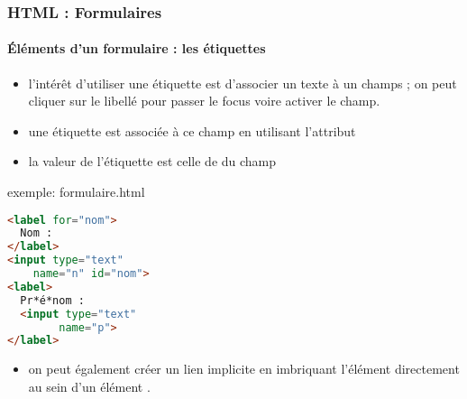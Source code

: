 \documentclass[xcolor=table]{beamer}
\begin{document}
\begin{frame}[fragile]
\frametitle{HTML : Formulaires}
\framesubtitle{Éléments d'un formulaire : les étiquettes}

\begin{minipage}{0.64\textwidth} 
	\begin{itemize}
		\item l'intérêt d'utiliser une étiquette est d'associer un texte à un champs ; on peut cliquer sur le libellé pour passer le focus voire activer le champ. 
		\item une étiquette est associée à ce champ en utilisant l'attribut 
		\item la valeur  de l'étiquette est celle de  du champ
	\end{itemize}
\end{minipage}
%
\begin{minipage}{0.35\textwidth}
\begin{exampleblock}{exemple: formulaire.html}
\lstset{escapeinside=**}
\scriptsize\bfseries\vspace{-6pt}
\begin{lstlisting}[language={html}]
<label for="nom">
  Nom : 
</label>
<input type="text" 
    name="n" id="nom">
<label>
  Pr*é*nom : 
  <input type="text" 
        name="p">
</label>
\end{lstlisting}\vspace{-6pt}
\end{exampleblock}
\end{minipage}
\begin{itemize}
	\item on peut également créer un lien implicite en imbriquant l'élément  directement au sein d'un élément .
\end{itemize}

\end{frame}
\end{document}
